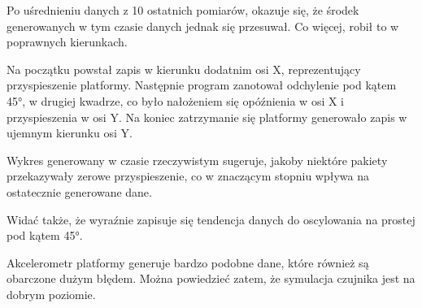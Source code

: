 		Po uśrednieniu danych z 10 ostatnich pomiarów, okazuje się, że środek generowanych w tym czasie danych jednak się przesuwał.
		Co więcej, robił to w poprawnych kierunkach.
		
		Na początku powstał zapis w kierunku dodatnim osi X, reprezentujący przyspieszenie platformy.
		Następnie program zanotował odchylenie pod kątem 45°, w drugiej kwadrze, co było nałożeniem się opóźnienia w osi X i przyspieszenia w osi Y.
		Na koniec zatrzymanie się platformy generowało zapis w ujemnym kierunku osi Y.
		
		Wykres generowany w czasie rzeczywistym sugeruje, jakoby niektóre pakiety przekazywały zerowe przyspieszenie, co w znaczącym stopniu wpływa na 
		ostatecznie generowane dane.
		
		Widać także, że wyraźnie zapisuje się tendencja danych do oscylowania na prostej pod kątem 45°.
		
		Akcelerometr platformy generuje bardzo podobne dane, które również są obarczone dużym błędem.
		Można powiedzieć zatem, że symulacja czujnika jest na dobrym poziomie.
		
		
		
		
		
	
	
